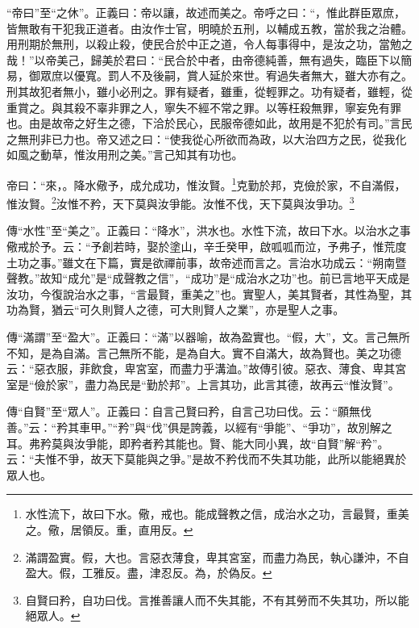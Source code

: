 {\noindent\shu{}\fzkt “帝曰”至“之休”。正義曰：帝以讓，故述而美之。帝呼之曰：“，惟此群臣眾庶，皆無敢有干犯我正道者。由汝作士官，明曉於五刑，以輔成五教，當於我之治體。用刑期於無刑，以殺止殺，使民合於中正之道，令人每事得中，是汝之功，當勉之哉！”以帝美己，歸美於君曰：“民合於中者，由帝德純善，無有過失，臨臣下以簡易，御眾庶以優寬。罰人不及後嗣，賞人延於來世。宥過失者無大，雖大亦有之。刑其故犯者無小，雖小必刑之。罪有疑者，雖重，從輕罪之。功有疑者，雖輕，從重賞之。與其殺不辜非罪之人，寧失不經不常之罪。以等枉殺無罪，寧妄免有罪也。由是故帝之好生之德，下洽於民心，民服帝德如此，故用是不犯於有司。”言民之無刑非已力也。帝又述之曰：“使我從心所欲而為政，以大治四方之民，從我化如風之動草，惟汝用刑之美。”言己知其有功也。 \par}

帝曰：“來，。降水儆予，成允成功，惟汝賢。\footnote{水性流下，故曰下水。儆，戒也。能成聲教之信，成治水之功，言最賢，重美之。儆，居領反。重，直用反。}克勤於邦，克儉於家，不自滿假，惟汝賢。\footnote{滿謂盈實。假，大也。言惡衣薄食，卑其宮室，而盡力為民，執心謙沖，不自盈大。假，工雅反。盡，津忍反。為，於偽反。}汝惟不矜，天下莫與汝爭能。汝惟不伐，天下莫與汝爭功。\footnote{自賢曰矜，自功曰伐。言推善讓人而不失其能，不有其勞而不失其功，所以能絕眾人。}

{\noindent\zhuan{}\fzbyks 傳“水性”至“美之”。正義曰：“降水”，洪水也。水性下流，故曰下水。以治水之事儆戒於予。云：“予創若時，娶於塗山，辛壬癸甲，啟呱呱而泣，予弗子，惟荒度土功之事。”雖文在下篇，實是欲禪前事，故帝述而言之。言治水功成云：“朔南暨聲教。”故知“成允”是“成聲教之信”，“成功”是“成治水之功”也。前已言地平天成是汝功，今復說治水之事，“言最賢，重美之”也。實聖人，美其賢者，其性為聖，其功為賢，猶云“可久則賢人之德，可大則賢人之業”，亦是聖人之事。 \par}

{\noindent\zhuan{}\fzbyks 傳“滿謂”至“盈大”。正義曰：“滿”以器喻，故為盈實也。“假，大”，文。言己無所不知，是為自滿。言己無所不能，是為自大。實不自滿大，故為賢也。美之功德云：“惡衣服，菲飲食，卑宮室，而盡力乎溝洫。”故傳引彼。惡衣、薄食、卑其宮室是“儉於家”，盡力為民是“勤於邦”。上言其功，此言其德，故再云“惟汝賢”。 \par}

{\noindent\zhuan{}\fzbyks 傳“自賢”至“眾人”。正義曰：自言己賢曰矜，自言己功曰伐。云：“願無伐善。”云：“矜其車甲。”“矜”與“伐”俱是誇義，以經有“爭能”、“爭功”，故別解之耳。弗矜莫與汝爭能，即矜者矜其能也。賢、能大同小異，故“自賢”解“矜”。云：“夫惟不爭，故天下莫能與之爭。”是故不矜伐而不失其功能，此所以能絕異於眾人也。 \par}

